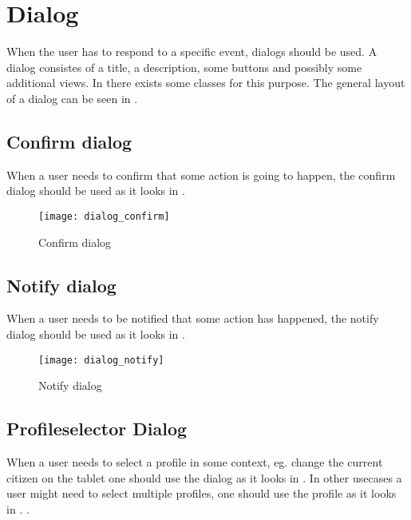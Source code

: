 
\chapter{Dialog}
\label{cha:dialog}


When the user has to respond to a specific event, dialogs should be used. A dialog consistes of a title, a description, some buttons and possibly some additional views. In \gc there exists some classes for this purpose. The general layout of a dialog can be seen in .

\section{Confirm dialog}
\label{sec:confirm_dialog}

When a user needs to confirm that some action is going to happen, the confirm dialog should be used as it looks in . 

\begin{figure}[h]
	\centering
	\texttt{[image: dialog\_confirm]}
	\caption{Confirm dialog}
	\label{fig:confirm_dialog}
\end{figure}
\FloatBarrier

\section{Notify dialog}
\label{sec:notify_dialog}

When a user needs to be notified that some action has happened, the notify dialog should be used as it looks in . 

\begin{figure}[h]
	\centering
	\texttt{[image: dialog\_notify]}
	\caption{Notify dialog}
	\label{fig:notify_dialog}
\end{figure}
\FloatBarrier

\section{Profileselector Dialog}
\label{sec:profileselector_dialog}

When a user needs to select a profile in some context, eg. change the current citizen on the tablet one should use the dialog as it looks in . In other usecases a user might need to select multiple profiles, one should use the profile as it looks in . .

